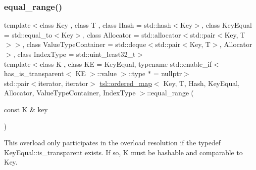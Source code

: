 \subsubsection{\texorpdfstring{equal\_range()}{equal\_range()}\hspace{0.1cm}{\footnotesize\ttfamily [3/6]}}
{\footnotesize\ttfamily template$<$class Key , class T , class Hash  = std\+::hash$<$\+Key$>$, class Key\+Equal  = std\+::equal\+\_\+to$<$\+Key$>$, class Allocator  = std\+::allocator$<$std\+::pair$<$\+Key, T$>$$>$, class Value\+Type\+Container  = std\+::deque$<$std\+::pair$<$\+Key, T$>$, Allocator$>$, class Index\+Type  = std\+::uint\+\_\+least32\+\_\+t$>$ \\
template$<$class K , class KE  = Key\+Equal, typename std\+::enable\+\_\+if$<$ has\+\_\+is\+\_\+transparent$<$ K\+E $>$\+::value $>$\+::type $\ast$  = nullptr$>$ \\
std\+::pair$<$iterator, iterator$>$ \mbox{\hyperlink{classtsl_1_1ordered__map}{tsl\+::ordered\+\_\+map}}$<$ Key, T, Hash, Key\+Equal, Allocator, Value\+Type\+Container, Index\+Type $>$\+::equal\+\_\+range (\begin{DoxyParamCaption}\item[{const K \&}]{key }\end{DoxyParamCaption})\hspace{0.3cm}{\ttfamily [inline]}}

This overload only participates in the overload resolution if the typedef Key\+Equal\+::is\+\_\+transparent exists. If so, K must be hashable and comparable to Key. \mbox{\label{classtsl_1_1ordered__map_aa7adb3e162ace9638429c88321d7d1df}} 
